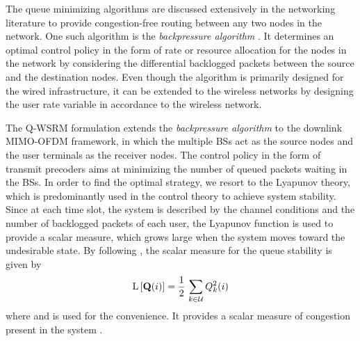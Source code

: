 
The queue minimizing algorithms are discussed extensively in the networking literature to provide congestion-free routing between any two nodes in the network. One such algorithm  is the \emph{backpressure algorithm} \cite{tassiulas,georgiadis2006resource,neely2010stochastic}. It determines an optimal control policy in the form of rate or resource allocation for the nodes in the network by considering the differential backlogged packets between the source and the destination nodes. Even though the algorithm is primarily designed for the wired infrastructure, it can be extended to the wireless networks by designing the user rate variable  in accordance to the wireless network.

The \ac{Q-WSRM} formulation extends the \emph{backpressure algorithm} to the downlink \ac{MIMO}-\ac{OFDM} framework, in which the multiple \acp{BS} act as the source nodes and the user terminals as the receiver nodes. The control policy in the form of transmit precoders aims at minimizing the number of queued packets waiting in the \acp{BS}. In order to find the optimal strategy, we resort to the Lyapunov theory, which is predominantly used in the control theory to achieve system stability. Since at each time slot, the system is described by the channel conditions and the number of backlogged packets of each user, the Lyapunov function is used to provide a scalar measure, which grows large when the system moves toward the undesirable state. By following \cite{neely2010stochastic}, the scalar measure for the queue stability is given by
\begin{equation}
\mathrm{L}\left [ \mathbf{Q}(i) \right ] = \frac{1}{2} \, \sum_{k \in \mathcal{U}} Q_k^2(i)
\end{equation}
where  and  is used for the convenience. It provides a scalar measure of congestion present in the system \cite[Ch. 3]{neely2010stochastic}. 

